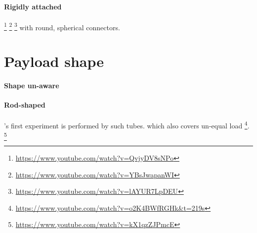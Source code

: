 \documentclass{article}
\begin{document}
		\paragraph{Rigidly attached}
		\cite{mellinger-2010-cooperative-grasping-and-transport-using-multiple-quadrotors}
		\cite{loianno-2017-cooperative-transportation-using-small-quadrotors-using-monocular-vision-and-inertial-sensing}
		\cite{tagliabue-2017-robust-collaborative-object-transportation-using-multiple-mavs}\footnote{\url{https://www.youtube.com/watch?v=QvjyDV8sNPo}}
		\cite{mellinger-2010-cooperative-grasping-and-transport-using-multiple-quadrotors}\footnote{\url{https://www.youtube.com/watch?v=YBsJwapanWI}}
		\cite{nguyen-2015-aerial-tool-operation-system-using-quadrotors-as-rotating-thrust-generators}\footnote{\url{https://www.youtube.com/watch?v=lAYUR7LpDEU}} with round, spherical connectors. 
	
	\section{Payload shape}
		\paragraph{Shape un-aware}
			\cite{tagliabue-2017-robust-collaborative-object-transportation-using-multiple-mavs}
			\cite{mellinger-2010-cooperative-grasping-and-transport-using-multiple-quadrotors}
		\paragraph{Rod-shaped}
			\cite{tagliabue-2017-collaborative-transportation-using-mavs-via-passive-force-control}
			\cite{tagliabue-2017-robust-collaborative-object-transportation-using-multiple-mavs}'s first experiment is performed by such tubes.
			\cite{gassner-2017-dynamic-collaboration-without-communication-vision-based-cable-suspended-load-transport-with-two-quadrotors}
			\cite{bandala-2018-payload-lift-and-transport-using-decentralized-unmanned-aerial-vehicle-quadcopter-teams}
			\cite{wu-2020-cooperative-transportation-of-drones-without-inter-agent-communication}
			\cite{mohiuddin-2020-energy-distribution-in-dual-uav-collaborative-transportation-through-load-sharing} which also covers un-equal load \footnote{\url{https://www.youtube.com/watch?v=o2K4BWfRGHk&t=219s}}.
			\cite{spurny-2019-cooperative-transport-of-large-objects-by-a-pair-of-unmanned-aerial-systems-using-sampling-based-motion-planning}
			\cite{lee-2018-an-integrated-framework-for-cooperative-aerial-manipulators-in-unknown-environments}\footnote{\url{https://www.youtube.com/watch?v=kX1qzZJPmcE}}
\end{document}
